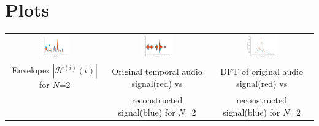 \documentclass[a4paper,10pt]{article}
\begin{document}
\section*{Plots}
\begin{center}
\begin{tiny}
\begin{tabular}{c c c}
\includegraphics[width=0.32\textwidth]{"a_2.jpg"} &
\includegraphics[width=0.32\textwidth]{"b_2.jpg"} &
\includegraphics[width=0.32\textwidth]{"c_2.jpg"} \\
Envelopes $|\mathcal{H}^{(i)}(t)|$ for $N$=2 &
Original temporal audio signal(red) vs  &
DFT of original audio signal(red) vs\\
&
reconstructed signal(blue) for $N$=2 &
reconstructed signal(blue) for $N$=2\\


\end{tabular}
\end{tiny}
\end{center}
\end{document}
